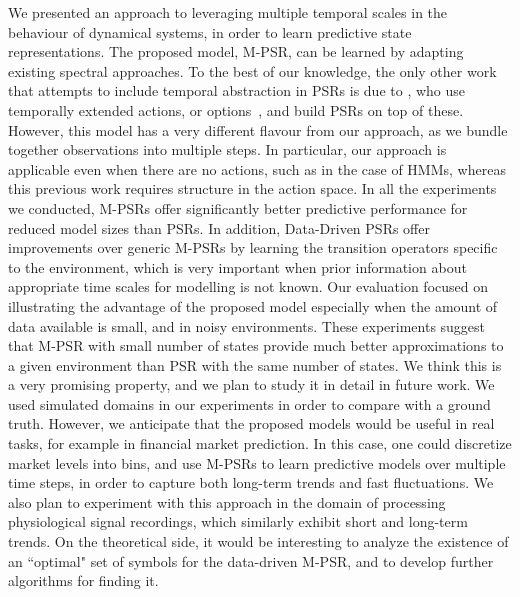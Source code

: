 \documentclass[letterpaper]{article}
\begin{document}
We presented an approach to leveraging multiple temporal scales in the behaviour of dynamical systems, in order to learn predictive state representations.  The proposed model, M-PSR, can be learned by adapting existing spectral approaches. To the best of our knowledge, the only other work that attempts to include temporal abstraction in PSRs is due to \cite{wolfe06}, who use temporally extended actions, or options~\cite{sutton99}, and build PSRs on top of these. However, this model has a very different flavour from our approach, as we bundle together observations into multiple steps. In particular, our approach is applicable even when there are no actions, such as in the case of HMMs, whereas this previous work requires structure in the action space. In all the experiments we conducted, M-PSRs offer significantly better predictive performance for reduced model sizes than PSRs. In addition, Data-Driven PSRs offer improvements over generic M-PSRs by learning the transition operators specific to the environment, which is very important when prior information about appropriate time scales for modelling is not known. Our evaluation focused on illustrating the advantage of the proposed model especially when the amount of data available is small, and in noisy environments. These experiments suggest that M-PSR with small number of states provide much better approximations to a given environment than PSR with the same number of states. We think this is a very promising property, and we plan to study it in detail in future work. We used simulated domains in our experiments in order to compare with a ground truth. However, we anticipate that the proposed models would be useful in real tasks, for example in financial market prediction. In this case, one could discretize market levels into bins, and use M-PSRs to learn predictive models over multiple time steps, in order to capture both long-term trends and fast fluctuations. We also plan to experiment with this approach in the domain of processing physiological signal recordings, which similarly exhibit short and long-term trends. On the theoretical side, it would be interesting to analyze the existence of an ``optimal" set of symbols for the data-driven M-PSR, and to develop further algorithms for finding it.



\end{document}
